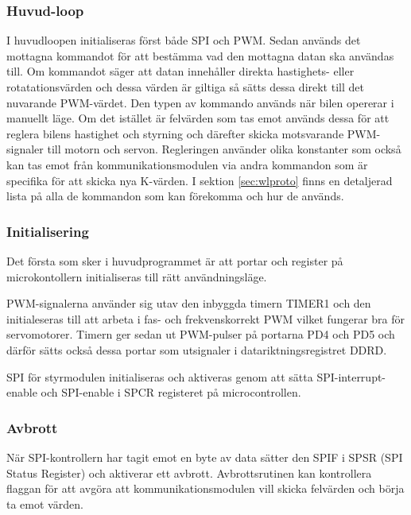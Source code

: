 \documentclass[tekniskrapport/tech.tex]{subfiles}
\begin{document}
\subsubsection{Huvud-loop} I huvudloopen initialiseras först både
SPI och PWM. Sedan används det mottagna kommandot för att bestämma vad den
mottagna datan ska användas till. Om kommandot säger att datan innehåller
direkta hastighets- eller rotatationsvärden och dessa värden är giltiga så
sätts dessa direkt till det nuvarande PWM-värdet. Den typen av kommando används
när bilen opererar i manuellt läge. Om det istället är felvärden som tas emot
används dessa för att reglera bilens hastighet och styrning och därefter skicka
motsvarande PWM-signaler till motorn och servon. Regleringen använder olika
konstanter som också kan tas emot från kommunikationsmodulen via andra
kommandon som är specifika för att skicka nya K-värden. I sektion
\ref{sec:wlproto} finns en detaljerad lista på alla de kommandon som kan
förekomma och hur de används.

\subsubsection{Initialisering} Det första som sker i huvudprogrammet är att
portar och register på microkontollern initialiseras till rätt användningsläge.

PWM-signalerna använder sig utav den inbyggda timern TIMER1 och den
initialeseras till att arbeta i fas- och frekvenskorrekt PWM vilket fungerar
bra för servomotorer. Timern ger sedan ut PWM-pulser på portarna PD4 och PD5
och därför sätts också dessa portar som utsignaler i datariktningsregistret
DDRD. 

SPI för styrmodulen initialiseras och aktiveras genom att sätta
SPI-interrupt-enable och SPI-enable i SPCR registeret på microcontrollen.

\subsubsection{Avbrott} \label{sec:ctrl-int}
När SPI-kontrollern har tagit emot en byte av data sätter den SPIF i SPSR (SPI
Status Register) och aktiverar ett avbrott. Avbrottsrutinen kan kontrollera
flaggan för att avgöra att kommunikationsmodulen vill skicka felvärden och
börja ta emot värden.
\end{document}
